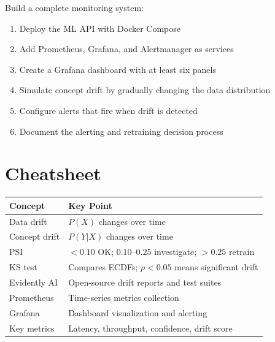 \begin{exercise}
Build a complete monitoring system:
\begin{enumerate}
  \item Deploy the ML API with Docker Compose
  \item Add Prometheus, Grafana, and Alertmanager as services
  \item Create a Grafana dashboard with at least six panels
  \item Simulate concept drift by gradually changing the data
    distribution
  \item Configure alerts that fire when drift is detected
  \item Document the alerting and retraining decision process
\end{enumerate}
\end{exercise}

\section{Cheatsheet}

\begin{cheatsheet}[title=\textbf{Chapter 10 Summary}]
\begin{tabular}{@{}p{4cm}p{8.5cm}@{}}
\toprule
\textbf{Concept} & \textbf{Key Point} \\
\midrule
Data drift & $P(X)$ changes over time \\
Concept drift & $P(Y|X)$ changes over time \\
PSI & $< 0.10$ OK; $0.10$--$0.25$ investigate; $> 0.25$ retrain \\
KS test & Compares ECDFs; $p < 0.05$ means significant drift \\
Evidently AI & Open-source drift reports and test suites \\
Prometheus & Time-series metrics collection \\
Grafana & Dashboard visualization and alerting \\
Key metrics & Latency, throughput, confidence, drift score \\
\bottomrule
\end{tabular}
\end{cheatsheet}
